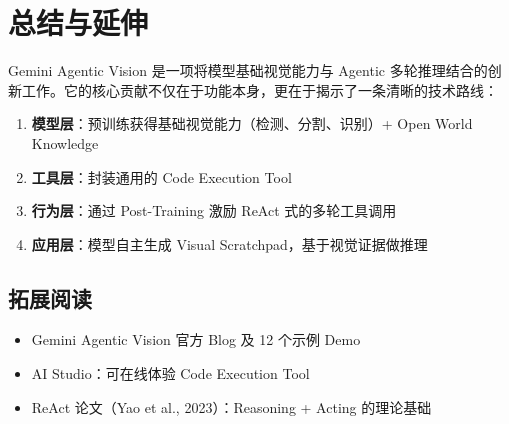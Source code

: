 \section{总结与延伸}

Gemini Agentic Vision 是一项将模型基础视觉能力与 Agentic 多轮推理结合的创新工作。它的核心贡献不仅在于功能本身，更在于揭示了一条清晰的技术路线：

\begin{enumerate}
    \item \textbf{模型层}：预训练获得基础视觉能力（检测、分割、识别）+ Open World Knowledge
    \item \textbf{工具层}：封装通用的 Code Execution Tool
    \item \textbf{行为层}：通过 Post-Training 激励 ReAct 式的多轮工具调用
    \item \textbf{应用层}：模型自主生成 Visual Scratchpad，基于视觉证据做推理
\end{enumerate}

\subsection{拓展阅读}

\begin{itemize}
    \item Gemini Agentic Vision 官方 Blog 及 12 个示例 Demo
    \item AI Studio：可在线体验 Code Execution Tool
    \item ReAct 论文（Yao et al., 2023）：Reasoning + Acting 的理论基础
\end{itemize}



